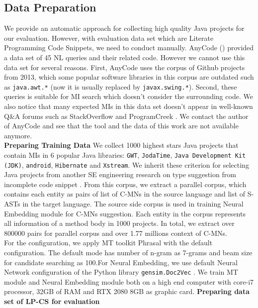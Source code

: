 \documentclass[sigconf,review,anonymous]{article}
\begin{document}
\subsection{Data Preparation}
We provide an automatic approach for collecting high quality Java projects for our evaluation. However, with evaluation data set which are Literate Programming Code Snippets, we need to conduct manually. AnyCode (\cite{007}) provided a data set of 45 NL queries and their related code. However we cannot use this data set for several reasons. First, AnyCode uses the corpus of Github projects from 2013, which some popular software libraries in this corpus are outdated such as \texttt{java.awt.*} (now it is usually replaced by \texttt{javax.swing.*}). Second, these queries is suitable for MI search which doesn't consider the surrounding code. We also notice that many expected MIs in this data set doesn't appear in well-known Q&A forums such as StackOverflow \cite{021} and ProgramCreek \cite{020}. We contact the author of AnyCode \cite{007} and see that the tool and the data of this work are not available anymore.
\\

\textbf{Preparing Training Data} We collect 1000 highest stars Java projects that contain MIs in 6 popular Java libraries: \texttt{GWT}, \texttt{JodaTime}, \texttt{Java Development Kit (JDK)}, \texttt{android}, \texttt{Hibernate} and \texttt{Xstream}. We inherit these criterion for selecting Java projects from another SE engineering research on type suggestion from incomplete code snippet \cite{022}. From this corpus, we extract a parallel corpus, which contains each entity as pairs of list of C-MNs in the source language and list of S-ASTs in the target language. The source side corpus is used in training Neural Embedding module for C-MNs suggestion. Each entity in the corpus represents all information of a method body in 1000 projects. In total, we extract over 800000 pairs for parallel corpus and over 1.77 millions context of C-MNs.
\\
For the configuration, we apply MT toolkit Phrasal \cite{015} with the default configuration. The default mode has number of n-gram as 7-grams and beam size for candidate searching as 100.For Neural Embedding, we use default Neural Network configuration of the Python library \texttt{gensim.Doc2Vec} \cite{023}. We train MT module and Neural Embedding module both on a high end computer with core-i7 processor, 32GB of RAM and RTX 2080 8GB as graphic card.
\textbf{Preparing data set of LP-CS for evaluation}
\end{document}

